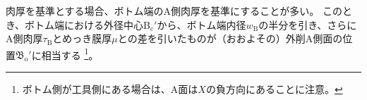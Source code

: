 肉厚を基準とする場合、ボトム端のA側肉厚を基準にすることが多い。
このとき、ボトム端における外径中心B$_\mathrm c'$から、ボトム端内径$w_\mathrm B$の半分を引き、さらにA側肉厚$\tau_\mathrm B$とめっき膜厚$\mu$との差を引いたものが（おおよその）外削A側面の位置$\mathfrak B_\mathrm o'$に相当する
\footnote{ボトム側が工具側にある場合は、A面は$X$の負方向にあることに注意。}。


